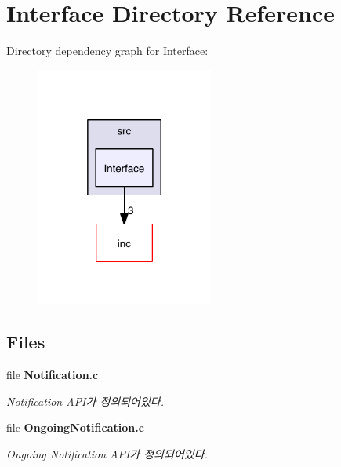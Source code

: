 \section{Interface Directory Reference}
\label{dir_8d70c067bb05a7a28022704ef2db23b5}
Directory dependency graph for Interface\-:\nopagebreak
\begin{figure}[H]
\begin{center}
\leavevmode
\includegraphics[width=166pt]{dir_8d70c067bb05a7a28022704ef2db23b5_dep}
\end{center}
\end{figure}
\subsection*{Files}
\begin{DoxyCompactItemize}
\item 
file {\bf Notification.\-c}
\begin{DoxyCompactList}\small\item\em Notification A\-P\-I가 정의되어있다. \end{DoxyCompactList}\item 
file {\bf Ongoing\-Notification.\-c}
\begin{DoxyCompactList}\small\item\em Ongoing Notification A\-P\-I가 정의되어있다. \end{DoxyCompactList}\end{DoxyCompactItemize}
